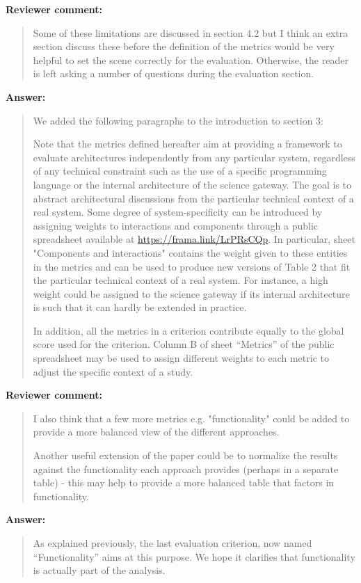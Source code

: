 \documentclass[a4]{article}
\newenvironment{review}%
{\textbf{Reviewer comment:}\begin{quote}}%
{\end{quote}}%
\newenvironment{answer}%
{\textbf{Answer:}\begin{small}\begin{quote}}%
{\end{quote}\end{small}}%
\newcommand{\revised}[1]{\color{blue} #1\color{black}\xspace}
\begin{document}
\begin{review}
Some of these limitations are discussed in section 4.2 but I think an
extra section discuss these before the definition of the metrics would
be very helpful to set the scene correctly for the
evaluation.  Otherwise, the reader is left asking a number of questions
during the evaluation section. 
\end{review}

\begin{answer}
We added the following paragraphs to the introduction to section 3:

\revised{Note that the metrics defined hereafter aim at providing a framework
to evaluate architectures independently from any particular system,
regardless of any technical constraint such as the use of a specific
programming language or the internal architecture of the science
gateway. The goal is to abstract architectural discussions from the
particular technical context of a real system. Some degree of
system-specificity can be introduced by assigning weights to
interactions and components through a public spreadsheet available at
\url{https://frama.link/LrPRsCQp}. In particular, sheet "Components
and interactions" contains the weight given to these entities in the
metrics and can be used to produce new versions of
Table 2 that fit the particular technical context
of a real system. For instance, a high weight could be assigned to the
science gateway if its internal architecture is such that it can
hardly be extended in practice.}

\revised{In addition, all the metrics in a criterion contribute
  equally to the global score used for the criterion. Column B of
  sheet ``Metrics'' of the public spreadsheet may be used to assign
  different weights to each metric to adjust the specific context of a
  study.}
\end{answer}

\begin{review}
I also think that a few more metrics
e.g. "functionality" could be added to provide a more balanced view of
the different approaches.

 Another useful extension of the paper could
be to normalize the results against the functionality each approach
provides (perhaps in a separate table) - this may help to provide a
more balanced table that factors in functionality.
\end{review}

\begin{answer}
  As explained previously, the last evaluation criterion, now named
  ``Functionality'' aims at this purpose. We hope it clarifies that
  functionality is actually part of the analysis. 
\end{answer}
\end{document}
